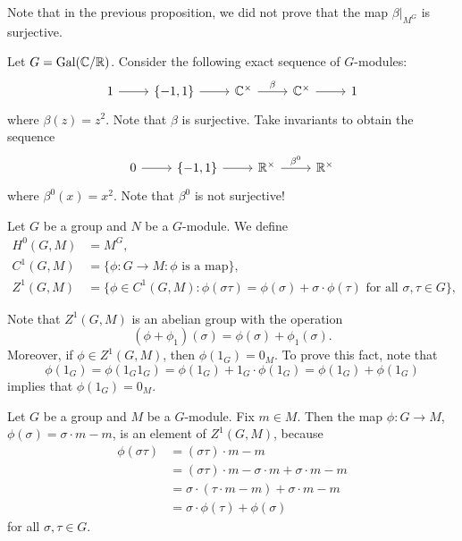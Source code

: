 Note that in the previous proposition, we did not prove that
the map $\beta|_{M^G}$ is surjective. 

\begin{example}
    Let $G=\operatorname{Gal}(\mathbb{C}/\mathbb{R})$. Consider the following exact sequence
    of $G$-modules:
    \[
    \begin{tikzcd}
    1 & \{-1,1\} & \C^\times & \C^\times & 1
    \arrow[from=1-1, to=1-2]
    \arrow[from=1-2, to=1-3]
    \arrow["\beta", from=1-3, to=1-4]
    \arrow[from=1-4, to=1-5]
    \end{tikzcd}    
    \]
    where $\beta(z)=z^2$. Note that $\beta$ is surjective. Take invariants 
    to obtain the sequence  
    \[
    \begin{tikzcd}
     0 & \{-1,1\} & \R^\times & \R^\times 
     \arrow[from=1-1, to=1-2]
     \arrow[from=1-2, to=1-3]
     \arrow["\beta^0", from=1-3, to=1-4]
     \end{tikzcd}
     \]
     where $\beta^0(x)=x^2$. Note that $\beta^0$ is not surjective! 
\end{example}

\begin{definition}
    Let $G$ be a group and $N$ be a $G$-module. 
    We define 
    \begin{align*}
        H^0(G,M)&=M^G,\\
        C^1(G,M)&=\{\phi\colon G\to M:\phi\text{ is a map}\},\\
        Z^1(G,M)&=\{\phi\in C^1(G,M):\phi(\sigma\tau)=\phi(\sigma)+\sigma\cdot\phi(\tau)\text{ for all $\sigma,\tau\in G$}\},
        \end{align*}    
\end{definition}

Note that $Z^1(G,M)$ is an abelian group with the operation
\[
(\phi+\phi_1)(\sigma)=\phi(\sigma)+\phi_1(\sigma).
\]
Moreover, if $\phi\in Z^1(G,M)$, then 
$\phi(1_G)=0_M$. To prove this fact, note that  
\[
\phi(1_G)=\phi(1_G1_G)=\phi(1_G)+1_G\cdot\phi(1_G)=\phi(1_G)+\phi(1_G)
\]
implies
that $\phi(1_G)=0_M$. 

\begin{example}
\label{exa:BinZ}
    Let $G$ be a group and $M$ be a $G$-module. Fix $m\in M$. Then
    the map $\phi\colon G\to M$, $\phi(\sigma)=\sigma\cdot m-m$, is an element 
    of $Z^1(G,M)$, because 
    \begin{align*}
    \phi(\sigma\tau)&=(\sigma\tau)\cdot m-m\\
    &=(\sigma\tau)\cdot m-\sigma\cdot m+\sigma\cdot m-m\\
    &=\sigma\cdot (\tau\cdot m-m)+\sigma\cdot m-m\\
    &=\sigma\cdot \phi(\tau)+\phi(\sigma)   
    \end{align*}
    for all $\sigma,\tau\in G$.
\end{example}

